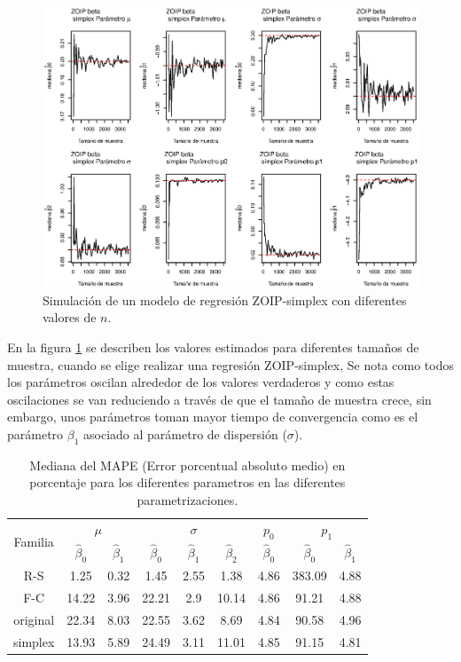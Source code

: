 \begin{figure}
	\begin{center}
		\includegraphics[scale=0.5]{Converg_Simplex.eps}	
		\caption{Simulaci\'{o}n de un modelo de regresi\'{o}n ZOIP-simplex con diferentes valores de $n$.}
		\label{Simu_simplex}
	\end{center}
\end{figure}

En la figura \ref{Simu_simplex} se describen los valores estimados para diferentes tama\~{n}os de muestra, cuando se elige realizar una regresi\'{o}n ZOIP-simplex, Se nota como todos los par\'{a}metros oscilan alrededor de los valores verdaderos y como estas oscilaciones se van reduciendo a trav\'{e}s de que el tama\~{n}o de muestra crece, sin embargo, unos par\'{a}metros toman mayor tiempo de convergencia como es el par\'{a}metro $\beta_1$ asociado al par\'{a}metro de dispersi\'{o}n ($\sigma$).\\



\begin{table}[!hbt]
{\scriptsize
\begin{center}
\begin{tabular}{|c|cc|ccc|c|cc|}\hline
\multirow{2}{*}{Familia} & \multicolumn{2}{|c|}{$\mu$} & \multicolumn{3}{|c|}{$\sigma$} & $p_0$ & \multicolumn{2}{|c|}{$p_1$} \\ \cline{2-9}
& $\hat{\beta}_0$& $\hat{\beta}_1$& $\hat{\beta}_0$& $\hat{\beta}_1$& $\hat{\beta}_2$& $\hat{\beta}_0$ & $\hat{\beta}_0$ & $\hat{\beta}_1$ \\ \hline \hline
R-S & 1.25 & 0.32 & 1.45 & 2.55 & 1.38 & 4.86 & 383.09 & 4.88 \\ 
F-C & 14.22 & 3.96 & 22.21 & 2.9 & 10.14 & 4.86 & 91.21 & 4.88 \\
original & 22.34 & 8.03 & 22.55 & 3.62 & 8.69 & 4.84 & 90.58 & 4.96 \\
simplex & 13.93 & 5.89 & 24.49 & 3.11 & 11.01 & 4.85 & 91.15 & 4.81 \\ \hline
\end{tabular}
\caption{Mediana del MAPE (Error porcentual absoluto medio) en porcentaje para los diferentes parametros en las diferentes parametrizaciones.}
\label{MAPE}
\end{center}
}
\end{table}

